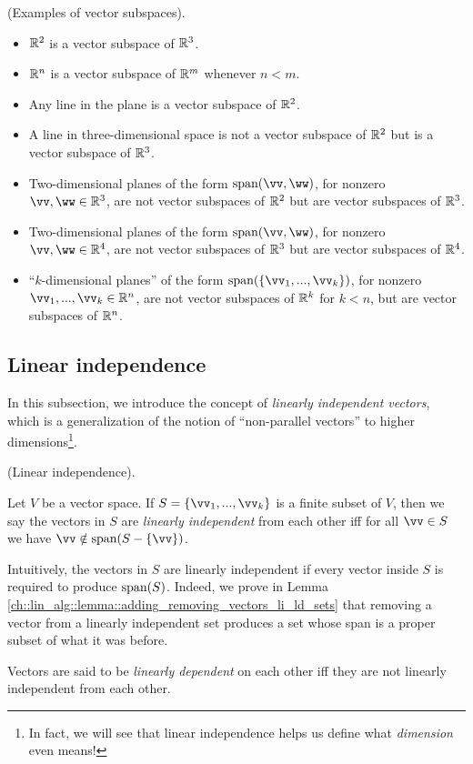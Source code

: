 \begin{remark}
    (Examples of vector subspaces).
    
    \begin{itemize}
        \item $\mathbb{R}^2$ is a vector subspace of $\mathbb{R}^3$.
        \item $\mathbb{R}^n$ is a vector subspace of $\mathbb{R}^m$ whenever $n < m$.
        \item Any line in the plane is a vector subspace of $\mathbb{R}^2$.
        \item A line in three-dimensional space is not a vector subspace of $\mathbb{R}^2$ but is a vector subspace of $\mathbb{R}^3$.
        \item Two-dimensional planes of the form $\spann(\vv, \ww)$, for nonzero $\vv, \ww \in \R^3$, are not vector subspaces of $\mathbb{R}^2$ but are vector subspaces of $\mathbb{R}^3$.
        \item Two-dimensional planes of the form $\spann(\vv, \ww)$, for nonzero $\vv, \ww \in \R^4$, are not vector subspaces of $\mathbb{R}^3$ but are vector subspaces of $\mathbb{R}^4$.
        \item ``$k$-dimensional planes'' of the form $\spann(\{\vv_1, ..., \vv_k\})$, for nonzero $\vv_1, ..., \vv_k \in \R^n$, are not vector subspaces of $\mathbb{R}^k$ for $k < n$, but are vector subspaces of $\mathbb{R}^n$.
    \end{itemize}
\end{remark}

\newpage

\subsection*{Linear independence}

In this subsection, we introduce the concept of \textit{linearly independent vectors}, which is a generalization of the notion of ``non-parallel vectors'' to higher dimensions\footnote{In fact, we will see that linear independence helps us define what \textit{dimension} even means!}.

\begin{defn}
    (Linear independence).
    
    Let $V$ be a vector space. If $S = \{\vv_1, ..., \vv_k\}$ is a finite subset of $V$, then we say the vectors in $S$ are \textit{linearly independent} from each other iff for all $\vv \in S$ we have $\vv \notin \spann(S - \{\vv\})$.
    
    Intuitively, the vectors in $S$ are linearly independent if every vector inside $S$ is required to produce $\text{span}(S)$. Indeed, we prove in Lemma \ref{ch::lin_alg::lemma::adding_removing_vectors_li_ld_sets} that removing a vector from a linearly independent set produces a set whose span is a proper subset of what it was before.
    
    Vectors are said to be \textit{linearly dependent} on each other iff they are not linearly independent from each other.
\end{defn}

